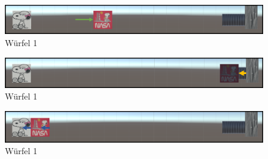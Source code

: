 \documentclass[../main.tex]{subfiles}
\begin{document}
    \begin{figure}[h]
        \begin{center}
            \centerline{\includegraphics[width=150mm]{./images/2Lab_2dPictureNr1.png}}
            \caption{Würfel 1}
            \label{2Lab_2dPictureNr1}
        \end{center}
    \end{figure}

    \begin{figure}[h]
        \begin{center}
            \centerline{\includegraphics[width=150mm]{./images/2Lab_2dPictureNr2.png}}
            \caption{Würfel 1}
            \label{2Lab_2dPictureNr2}
        \end{center}
    \end{figure}

    \begin{figure}[h]
        \begin{center}
            \centerline{\includegraphics[width=150mm]{./images/2Lab_2dPictureNr3.png}}
            \caption{Würfel 1}
            \label{2Lab_2dPictureNr3}
        \end{center}
    \end{figure}
\end{document}
